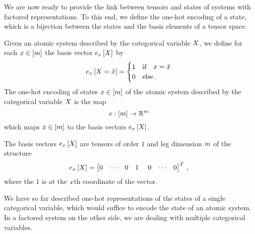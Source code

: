 
We are now ready to provide the link between tensors and states of systems with factored representations.
To this end, we define the one-hot encoding of a state, which is a bijection between the states and the basis elements of a tensor space.

\begin{definition}
	Given an atomic system described by the categorical variable $X$, we define for each $x\in[m]$ the basis vector $e_{x}\left[X\right]$ by
	\begin{align}
		e_{x}\left[X=\tilde{x}\right] = \begin{cases}
			1 & \text{if} \quad x=\tilde{x} \\
			0 & \text{else} \, .
		\end{cases}
	\end{align}
	The one-hot encoding of states $x\in[m]$ of the atomic system described by the categorical variable $X$ is the map
		\[ e: [m] \rightarrow \mathbb{R}^m \]
	which maps $x \in [m]$ to the basis vectors $e_{x}\left[X\right]$.
\end{definition}

The basis vectors $e_{x}\left[X\right]$ are tensors of order $1$ and leg dimension $m$ of the structure
\begin{align}
	\onehotmapofat{\catindex}{\catvariable} = \begin{bmatrix}
	0 & \cdots & 0 & 1 &  0 & \cdots & 0
	\end{bmatrix}^T \, ,
\end{align}
where the $1$ is at the $x$th coordinate of the vector.

We have so far described one-hot representations of the states of a single categorical variable, which would suffice to encode the state of an atomic system.
In a factored system on the other side, we are dealing with multiple categorical variables.

